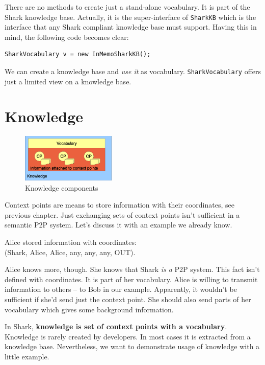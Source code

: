There are no methods to create just a stand-alone vocabulary. It is part of the Shark knowledge base. Actually, it is the super-interface of {\tt SharkKB} which is the interface that any Shark compliant knowledge base must support.
Having this in mind, the following code becomes clear:

\begin{verbatim}
SharkVocabulary v = new InMemoSharkKB();
\end{verbatim}

We can create a knowledge base and {\it use it} as vocabulary. 
{\tt SharkVocabulary} offers just a limited view on a knowledge base.

\section{Knowledge}
\begin{figure}[t]
\centering
\includegraphics[width=0.40\textwidth]{knowledgecomponents.eps}
\caption{Knowledge components}
\label{fig:knowledgecomponents}
\end{figure}

Context points are means to store information with their coordinates, see previous chapter. Just exchanging sets of context points isn't sufficient in a semantic P2P system. Let's discuss it with an example we already know.

Alice stored information with coordinates: \\
(Shark, Alice, Alice, any, any, any, OUT).

Alice knows more, though. She knows that Shark {\it is a} P2P system. This fact isn't defined with coordinates. It is part of her vocabulary. Alice is willing to transmit information to others -- to Bob in our example. Apparently, it wouldn't be sufficient if she'd send just the context point. She should also send parts of her vocabulary which gives some background information.

In Shark, {\bf knowledge is set of context points with a vocabulary}. Knowledge is rarely created by developers. In most cases it is extracted from a knowledge base. Nevertheless, we want to demonstrate usage of knowledge with a little example.



